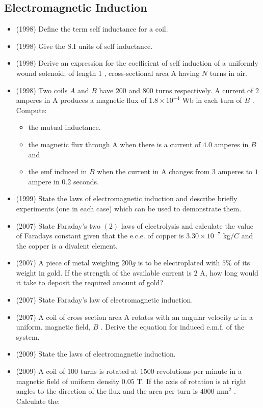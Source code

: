 \documentclass{article}
\begin{document}
\subsection{Electromagnetic Induction}
\begin{itemize}
\item (1998)  Define the term self inductance for a coil.
\item (1998)  Give the S.I units of self inductance.
\item (1998)  Derive an expression for the coefficient of self induction of a uniformly wound solenoid; of length $ 1$ , cross-sectional area A having $ N$ turns in air.
\item (1998)  Two coils $ A$ and $ B$ have $ 200$ and $ 800$ turns respectively. A current of $ 2$ amperes in A produces a magnetic flux of $ 1.8 \times 10^{-4}$ Wb in each turn of $ B$ . Compute:
 \begin{itemize}
\item the mutual inductance.
\item the magnetic flux through A when there is a current of $ 4.0$ amperes in $ B$ and
\item the emf induced in $ B$ when the current in A changes from $ 3$ amperes to $ 1$ ampere in $ 0.2$ seconds.
\end{itemize}
\item (1999)  State the laws of electromagnetic induction and describe briefly experiments (one in each case) which can be used to demonstrate them.
\item (2007)  State Faraday’s two $ (2)$ laws of electrolysis and calculate the value of Faradays constant given that the e.c.e. of copper is $ 3.30 \times 10^{-7}$ kg$/C$ and the copper is a divalent element. 
\item (2007)  A piece of metal weighing $ 200g$ is to be electroplated with $ 5\%$ of its weight in gold. If the strength of the available current is $ 2$ A, how long would it take to deposit the required amount of gold?
\item (2007)  State Faraday’s law of electromagnetic induction. 
\item (2007)  A coil of cross section area A rotates with an angular velocity $ \omega $ in a uniform. magnetic field, $ B$ . Derive the equation for induced e.m.f. of the system.
\item (2009)  State the laws of electromagnetic induction.
\item (2009)  A coil of $ 100$ turns is rotated at $ 1500$ revolutions per minute in a magnetic field of uniform density $ 0.05$ T.  If the axis of rotation is at right angles to the direction of the flux and the area per turn is $ 4000 $ mm$ ^{2}$ .  Calculate the:

\end{itemize}
\end{document}
